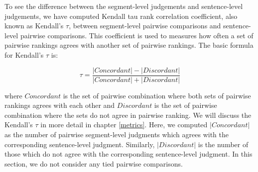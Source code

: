 To see the difference between the segment-level judgements and sentence-level
judgements, we have computed Kendall tau rank correlation coefficient, also
known as Kendall's $\tau$, between segment-level pairwise comparisons and
sentence-level pairwise comparisons. This coefficient is used to measures how
often a set of pairwise rankings agrees with another set of pairwise rankings.
The basic formula for Kendall's $\tau$ is:

\begin{equation*}
  \tau = \frac{|Concordant| - |Discordant|}{|Concordant| + |Discordant|}
\end{equation*}

\noindent where $Concordant$ is the set of pairwise combination where both sets
of pairwise rankings agrees with each other and $Discordant$ is the set of
pairwise combination where the sets do not agree in pairwise ranking.  We will
discuss the Kendall's $\tau$ in more detail in chapter \ref{metrics}. Here, we
computed $|Concordant|$ as the number of pairwise segment-level judgments which
agrees with the corresponding sentence-level judgment. Similarly,
$|Discordant|$ is the number of those which do not agree with the corresponding
sentence-level judgment. In this section, we do not consider any tied pairwise
comparisons.

